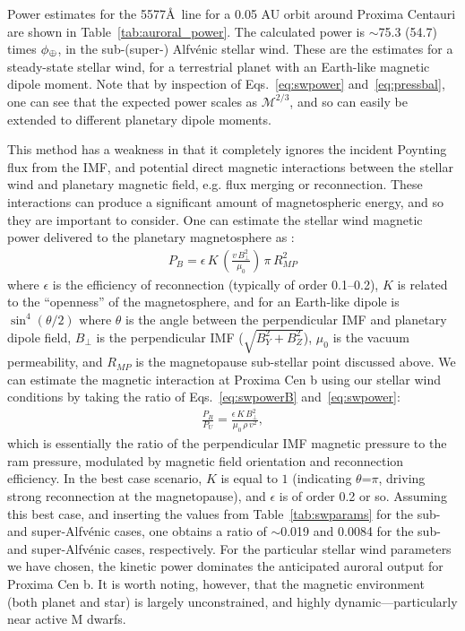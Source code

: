\documentclass{emulateapj}
\newcommand{\XXX}[1]{#1}      %
\begin{document}
Power estimates for the 5577\AA\ line for a 0.05 AU orbit around Proxima Centauri are shown in Table~\ref{tab:auroral_power}. \XXX{The calculated power is $\sim$75.3 (54.7) times $\phi_{\oplus}$, in the sub-\mbox{(super-)} Alfv\'{e}nic stellar wind. These are the estimates for a steady-state stellar wind, for a terrestrial planet with an Earth-like magnetic dipole moment. Note that by inspection of Eqs.~\ref{eq:swpower} and~\ref{eq:pressbal}, one can see that the expected power scales as $\mathcal{M}^{2/3}$, and so can easily be extended to different planetary dipole moments.} 


This method has a weakness in that it completely ignores the incident Poynting flux from the IMF, and potential direct magnetic interactions between the stellar wind and planetary magnetic field, e.g. flux merging or reconnection. These interactions can produce a significant amount of magnetospheric energy, and so they are important to consider. 
\XXX{One can estimate the stellar wind magnetic power delivered to the planetary magnetosphere as \citep[e.g.][]{Zarka2006,Zarka2007,Grie2007}:}
%
\begin{align}
    P_{B} = \epsilon\, K\, \left( \frac{v\,B_{\perp}^2}{\mu_0} \right)\,\pi\,R_{MP}^2 \label{eq:swpowerB}
\end{align}
%
\XXX{where $\epsilon$ is the efficiency of reconnection (typically of order 0.1--0.2), $K$ is related to the ``openness'' of the magnetosphere, and for an Earth-like dipole is $\sin^4(\theta/2)$ where $\theta$ is the angle between the perpendicular IMF and planetary dipole field, $B_{\perp}$ is the perpendicular IMF ($\sqrt{B_Y^2+B_Z^2}$), $\mu_0$ is the vacuum permeability, and $R_{MP}$ is the magnetopause sub-stellar point discussed above. We can estimate the magnetic interaction at Proxima Cen b using our stellar wind conditions by taking the ratio of Eqs.~\ref{eq:swpowerB} and~\ref{eq:swpower}:}
%
\begin{align}
    \frac{P_B}{P_U} = \frac{\epsilon\, K\, B_{\perp}^2}{\mu_0\, \rho\,v^2}, \label{eq:swpower_ratio}
\end{align}
%
\XXX{which is essentially the ratio of the perpendicular IMF magnetic pressure to the ram pressure, modulated by magnetic field orientation and reconnection efficiency. In the best case scenario, $K$ is equal to $1$ (indicating $\theta$=$\pi$, driving strong reconnection at the magnetopause), and $\epsilon$ is of order 0.2 or so. Assuming this best case, and inserting the values from Table~\ref{tab:swparams} for the sub- and super-Alfv\'{e}nic cases, one obtains a ratio of $\sim$0.019 and 0.0084 for the sub- and super-Alfv\'{e}nic cases, respectively. For the particular stellar wind parameters we have chosen, the kinetic power dominates the anticipated auroral output for Proxima Cen b. It is worth noting, however, that the magnetic environment (both planet and star) is largely unconstrained, and highly dynamic---particularly near active M dwarfs.}
\end{document}
